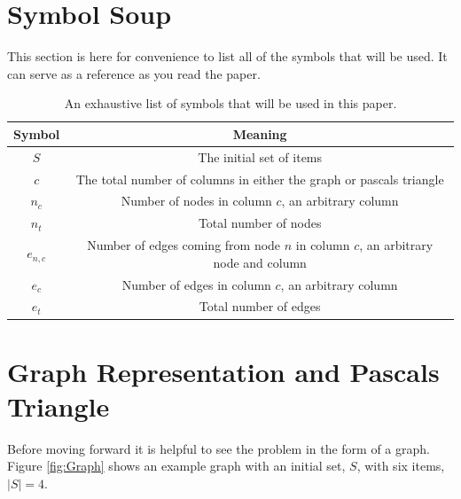 \documentclass{article}
\begin{document}
\section{Symbol Soup}
\label{sec:SymbolSoup}

This section is here for convenience to list all of the symbols that will be used. It can serve as a reference as you read the paper.

\begin{table}[h]
    \centering
    \begin{tabular}{|c|c|}
        \hline
        Symbol &  Meaning \\
        \hline
        $S$ & The initial set of items \\
        \hline
        $c$ & The total number of columns in either the graph or pascals triangle \\
        \hline
        $n_c$ & Number of nodes in column $c$, an arbitrary column \\
        \hline
        $n_t$ & Total number of nodes \\
        \hline
        $e_{n,c}$ & Number of edges coming from node $n$ in column $c$, an arbitrary node and column \\
        \hline
        $e_c$ & Number of edges in column $c$, an arbitrary column \\
        \hline
        $e_t$ & Total number of edges \\
        \hline
    \end{tabular}
    \caption{An exhaustive list of symbols that will be used in this paper.}
    \label{tab:symbolList}
\end{table}

\section{Graph Representation and Pascals Triangle}
\label{sec:GraphAndPascalsTriangle}

Before moving forward it is helpful to see the problem in the form of a graph. Figure \ref{fig:Graph} shows an example graph with an initial set, $S$, with six items, $|S|=4$.
\end{document}
